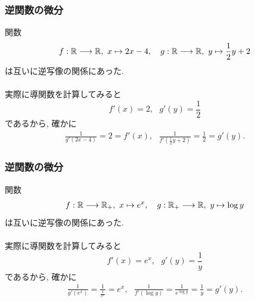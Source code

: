 

\begin{frame}
\frametitle{逆関数の微分}


関数
$$
f:\mathbb{R} \longrightarrow \mathbb{R}, \  x \mapsto 2x-4, \ \ \  g:\mathbb{R} \longrightarrow \mathbb{R}, \ y \mapsto \frac{1}{2}y+2
$$
は互いに逆写像の関係にあった. \\
\ \\

実際に導関数を計算してみると
$$
f'(x)=2, \ \ \ g'(y)= \frac{1}{2}
$$
であるから, 確かに
\begin{align*}
 \frac{1}{g'(2x-4)} = 2 = f'(x), \ \ \ \frac{1}{f'(\frac{1}{2}y+2)}=\frac{1}{2}=g'(y). 
\end{align*}



\end{frame}






\begin{frame}
\frametitle{逆関数の微分}


関数
\begin{align*}
f: \R \longrightarrow \R_+, \  x \mapsto e^x, \ \ \ 
g: \R_+ \longrightarrow \R, \ y \mapsto \log y
\end{align*}
は互いに逆写像の関係にあった. \\
\ \\

実際に導関数を計算してみると
$$
f'(x)=e^x, \ \ \ g'(y)= \frac{1}{y}
$$
であるから, 確かに
\begin{align*}
\frac{1}{g'(e^x)} = \frac{1}{\frac{1}{e^x}}=e^x, \ \ \ \frac{1}{f'(\log y)}=\frac{1}{e^{\log y}}=\frac{1}{y}=g'(y). 
\end{align*}



\end{frame}





